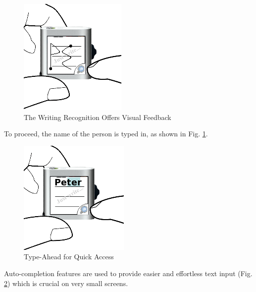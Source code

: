 \begin{figure}[h]
  \begin{center}
    \includegraphics[width=0.6\linewidth]{imgs/wt2.png}
  \end{center}
  \caption{The Writing Recognition Offers Visual Feedback}
  \label{fig:wt2}
\end{figure}
%
To proceed, the name of the person is typed in, as shown in Fig. \ref{fig:wt2}.
\\
\begin{figure}[h]
  \begin{center}
    \includegraphics[width=0.6\linewidth]{imgs/wt3.png}
  \end{center}
  \caption{Type-Ahead for Quick Access}
  \label{fig:wt3}
\end{figure}
%
Auto-completion features are used to provide easier and effortless text input (Fig. \ref{fig:wt3}) which is crucial on very small screens.\\
